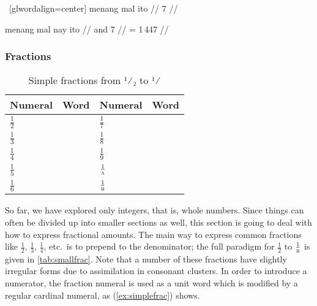 \xe

\pex~[glwordalign=center]\label{ex:numsgldig}
\a\ljudge\ques\begingl
	\gla menang mal ito //
	 {\ten} {7} //
\endgl

\a\begingl
	\gla menang mal nay ito //
	 {\ten} and {7} //
	\glft {} = 1\,447 //
\endgl

\xe


\subsubsection{Fractions}

\begin{table}[tp]\centering
\caption[Simple fractions from $\frac{1}{2}$ to $\frac{1}{\elv}$]{Simple 
fractions from ¹⁄₂ to ¹⁄\tsub{\elv}}
\begin{tabu} to .75\linewidth {X[1c] X[2c] X[1c] X[2c]}
\toprule\tableheaderfont
Numeral
	& Word
	& Numeral
	& Word
	\\
\toprule

$\frac{1}{2}$ & 
& $\frac{1}{7}$ &  \\ [.25\baselineskip]

$\frac{1}{3}$ & 
& $\frac{1}{8}$ &  \\ [.25\baselineskip]

$\frac{1}{4}$ & 
& $\frac{1}{9}$ &  \\ [.25\baselineskip]

$\frac{1}{5}$ & 
& $\frac{1}{\textsc{a}}$ &  \\ [.25\baselineskip]

$\frac{1}{6}$ & 
& $\frac{1}{\elv}$ &  \\

\bottomrule
\end{tabu}
\label{tab:smallfrac}
\end{table}

So far, we have explored only integers, that is, whole numbers. Since things
can often be divided up into smaller sections as well, this section is going to
deal with how to express fractional amounts. The main way to express common
fractions like $\frac{1}{2}$, $\frac{1}{3}$, $\frac{1}{4}$, etc.\ is to prepend
 to the denominator; the full paradigm for $\frac{1}{2}$
to $\frac{1}{\elv}$ is given in \autoref{tab:smallfrac}. Note that a number of
these fractions have slightly irregular forms due to assimilation in consonant
clusters. In order to introduce a numerator, the fraction numeral is used as a
unit word which is modified by a regular cardinal numeral, as
(\ref{ex:simplefrac}) shows.


